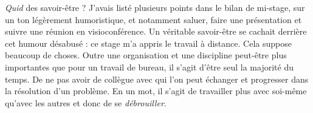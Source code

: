 \textit{Quid} des savoir-être ? J'avais listé plusieurs points dans le bilan de mi-stage, sur un ton légèrement humoristique, et notamment saluer, faire une présentation et suivre une réunion en visioconférence. Un véritable savoir-être se cachait derrière cet humour désabusé :  ce stage m'a appris le travail à distance. Cela suppose beaucoup de choses. Outre une organisation et une discipline peut-être plus importantes que pour un travail de bureau, il s'agit d'être seul la majorité du temps. De ne pas avoir de collègue avec qui l'on peut échanger et progresser dans la résolution d'un problème. En un mot, il s'agit de travailler plus avec soi-même qu'avec les autres et donc de se \textit{débrouiller}.